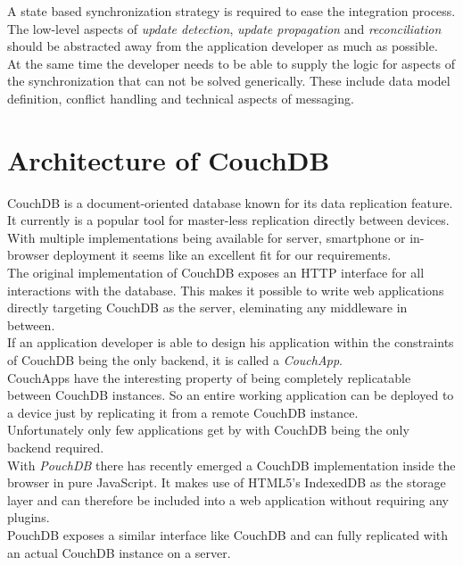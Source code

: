 A state based synchronization strategy is required to ease the integration process. The low-level aspects of \emph{update detection}, \emph{update propagation} and \emph{reconciliation} should be abstracted away from the application developer as much as possible.\\
At the same time the developer needs to be able to supply the logic for aspects of the synchronization that can not be solved generically. These include data model definition, conflict handling and technical aspects of messaging.

\section{Architecture of CouchDB}
CouchDB is a document-oriented database known for its data replication feature.
It currently is a popular tool for master-less replication directly between devices.\\
With multiple implementations being available for server, smartphone or in-browser deployment it seems like an excellent fit for our requirements.\\

The original implementation of CouchDB exposes an HTTP interface for all interactions with the database.
This makes it possible to write web applications directly targeting CouchDB as the server, eleminating any middleware in between.\\
If an application developer is able to design his application within the constraints of CouchDB being the only backend, it is called a \emph{CouchApp}.\\
CouchApps have the interesting property of being completely replicatable between CouchDB instances.
So an entire working application can be deployed to a device just by replicating it from a remote CouchDB instance.\\
Unfortunately only few applications get by with CouchDB being the only backend required.\\

With \emph{PouchDB} there has recently emerged a CouchDB implementation inside the browser in pure JavaScript.
It makes use of HTML5's IndexedDB as the storage layer and can therefore be included into a web application without requiring any plugins.\\
PouchDB exposes a similar interface like CouchDB and can fully replicated with an actual CouchDB instance on a server.\\

